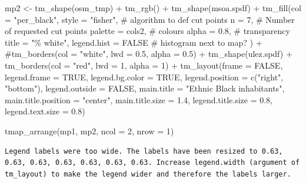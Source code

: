 \documentclass[
  letterpaper,
  DIV=11,
  numbers=noendperiod]{scrreprt}
\newenvironment{Shaded}{\begin{snugshade}}{\end{snugshade}}
\newcommand{\AttributeTok}[1]{\textcolor[rgb]{0.40,0.45,0.13}{#1}}
\newcommand{\CommentTok}[1]{\textcolor[rgb]{0.37,0.37,0.37}{#1}}
\newcommand{\ConstantTok}[1]{\textcolor[rgb]{0.56,0.35,0.01}{#1}}
\newcommand{\DecValTok}[1]{\textcolor[rgb]{0.68,0.00,0.00}{#1}}
\newcommand{\FloatTok}[1]{\textcolor[rgb]{0.68,0.00,0.00}{#1}}
\newcommand{\FunctionTok}[1]{\textcolor[rgb]{0.28,0.35,0.67}{#1}}
\newcommand{\NormalTok}[1]{\textcolor[rgb]{0.00,0.23,0.31}{#1}}
\newcommand{\OtherTok}[1]{\textcolor[rgb]{0.00,0.23,0.31}{#1}}
\newcommand{\SpecialCharTok}[1]{\textcolor[rgb]{0.37,0.37,0.37}{#1}}
\newcommand{\StringTok}[1]{\textcolor[rgb]{0.13,0.47,0.30}{#1}}
\begin{document}
\begin{Shaded}
\begin{Highlighting}[]
\NormalTok{mp2 }\OtherTok{\textless{}{-}}  \FunctionTok{tm\_shape}\NormalTok{(osm\_tmp) }\SpecialCharTok{+} \FunctionTok{tm\_rgb}\NormalTok{() }\SpecialCharTok{+}
  \FunctionTok{tm\_shape}\NormalTok{(msoa.spdf) }\SpecialCharTok{+} 
  \FunctionTok{tm\_fill}\NormalTok{(}\AttributeTok{col =} \StringTok{"per\_black"}\NormalTok{, }
          \AttributeTok{style =} \StringTok{"fisher"}\NormalTok{, }\CommentTok{\# algorithm to def cut points}
          \AttributeTok{n =} \DecValTok{7}\NormalTok{, }\CommentTok{\# Number of requested cut points}
          \AttributeTok{palette =}\NormalTok{ cols2, }\CommentTok{\# colours}
          \AttributeTok{alpha =} \FloatTok{0.8}\NormalTok{, }\CommentTok{\# transparency }
          \AttributeTok{title =} \StringTok{"\% white"}\NormalTok{, }
          \AttributeTok{legend.hist =} \ConstantTok{FALSE} \CommentTok{\# histogram next to map?}
\NormalTok{          ) }\SpecialCharTok{+}
  \CommentTok{\#tm\_borders(col = "white", lwd = 0.5, alpha = 0.5) +}
  \FunctionTok{tm\_shape}\NormalTok{(ulez.spdf) }\SpecialCharTok{+}
  \FunctionTok{tm\_borders}\NormalTok{(}\AttributeTok{col =} \StringTok{"red"}\NormalTok{, }\AttributeTok{lwd =} \DecValTok{1}\NormalTok{, }\AttributeTok{alpha =} \DecValTok{1}\NormalTok{) }\SpecialCharTok{+}
  \FunctionTok{tm\_layout}\NormalTok{(}\AttributeTok{frame =} \ConstantTok{FALSE}\NormalTok{,}
            \AttributeTok{legend.frame =} \ConstantTok{TRUE}\NormalTok{, }\AttributeTok{legend.bg.color =} \ConstantTok{TRUE}\NormalTok{,}
            \AttributeTok{legend.position =} \FunctionTok{c}\NormalTok{(}\StringTok{"right"}\NormalTok{, }\StringTok{"bottom"}\NormalTok{),}
            \AttributeTok{legend.outside =} \ConstantTok{FALSE}\NormalTok{,}
            \AttributeTok{main.title =} \StringTok{"Ethnic Black inhabitants"}\NormalTok{, }
            \AttributeTok{main.title.position =} \StringTok{"center"}\NormalTok{,}
            \AttributeTok{main.title.size =} \FloatTok{1.4}\NormalTok{,}
            \AttributeTok{legend.title.size =} \FloatTok{0.8}\NormalTok{,}
            \AttributeTok{legend.text.size =} \FloatTok{0.8}\NormalTok{)}

\FunctionTok{tmap\_arrange}\NormalTok{(mp1, mp2, }\AttributeTok{ncol =} \DecValTok{2}\NormalTok{, }\AttributeTok{nrow =} \DecValTok{1}\NormalTok{)}
\end{Highlighting}
\end{Shaded}

\begin{verbatim}
Legend labels were too wide. The labels have been resized to 0.63, 0.63, 0.63, 0.63, 0.63, 0.63, 0.63. Increase legend.width (argument of tm_layout) to make the legend wider and therefore the labels larger.
\end{verbatim}
\end{document}
